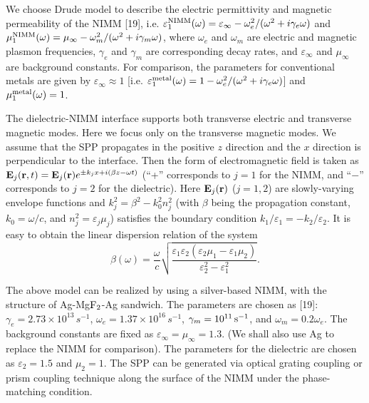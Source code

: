 \documentclass[aps,pra,preprint,groupedaddress,amsmath,amssymb,showpacs]{revtex4-1}
\begin{document}
\vskip 0.75cm

We choose Drude model to describe the electric permittivity and magnetic permeability
of the NIMM [19], i.e. $\varepsilon_{1}^{\rm NIMM}(\omega)=\varepsilon_{\infty}-\omega_e^2/(\omega^2+i\gamma_e\omega)$ and $\mu_{1}^{\rm NIMM}(\omega)=\mu_{\infty}-\omega_m^2/(\omega^2+i\gamma_m\omega)$,
where $\omega_e$ and $\omega_m$ are electric and magnetic plasmon frequencies, $\gamma_e$ and $\gamma_m$ are corresponding decay rates, and $\varepsilon_{\infty}$ and $\mu_{\infty}$ are background constants. For comparison, the parameters for conventional metals are given by $\varepsilon_{\infty}\approx1$ [i.e. $\varepsilon_{1}^{\rm metal}(\omega)=1-\omega_e^2/(\omega^2+i\gamma_e\omega)$] and $\mu_{1}^{\rm metal}(\omega)=1$.


\vskip 0.75cm

The dielectric-NIMM interface supports both transverse electric and transverse magnetic modes. Here we focus only on the transverse magnetic modes. We assume that the SPP propagates in the positive $z$ direction and the $x$ direction is perpendicular to the interface. Then the form of electromagnetic field is taken as ${\bf E}_j({\bf r},t)={\bf E}_j({\bf r})e^{\pm k_jx+i(\beta z-\omega t)}$ (``+'' corresponds to $j=1$ for the NIMM, and  ``$-$'' corresponds to $j=2$ for the dielectric). Here ${\bf E}_j({\bf r})$ ($j=1,2$) are slowly-varying envelope functions and $k_j^2=\beta^2-k_0^2n_j^2$ (with $\beta$ being the propagation constant, $k_0=\omega/c$, and $n_j^2=\varepsilon_j\mu_j$) satisfies the boundary condition ${k_1}/{\varepsilon_1}=-{k_2}/{\varepsilon_2}$. It is easy to obtain the linear dispersion relation of the system
\begin{equation}
\beta(\omega)=\frac{\omega}{c}\sqrt{\frac{\varepsilon_1\varepsilon_2(\varepsilon_2\mu_1-\varepsilon_1\mu_2)}{\varepsilon_2^2-\varepsilon_1^2}}.
\label{characteristic dispersion relation}
\end{equation}


\vskip 0.75cm

The above model can be realized by using a silver-based NIMM, with the structure of Ag-Mg$\rm F_2$-Ag sandwich. The parameters are chosen as [19]: $\gamma_{e}=2.73\times10^{13}\,{s^{-1}}$, $\omega_{e}=1.37\times10^{16}\,{s^{-1}}$, $\gamma_{m}=10^{11}\,{\rm s}^{-1}$, and $\omega_{m}=0.2\omega_{e}$. The background constants are fixed as $\varepsilon_{\infty}=\mu_{\infty}=1.3$. (We shall also use Ag to replace the NIMM for comparison). The parameters for the dielectric are chosen as $\varepsilon_2=1.5$ and $\mu_2=1$. The SPP can be generated via optical grating coupling or prism coupling technique along the surface of the NIMM under the phase-matching condition.
\end{document}
